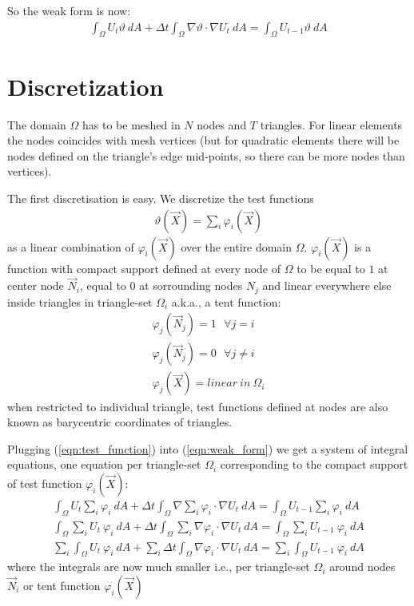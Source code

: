 \documentclass{birkjour}
\numberwithin{equation}{section}
\begin{document}
So the weak form is now:
\begin{eqnarray}
	\label{eqn:weak_form}
	\int_{\Omega}{ U_t \vartheta \ dA } + \Delta t \int_{\Omega}{ \nabla \vartheta \cdot \nabla U_t \ dA} = \int_{\Omega} { U_{t-1} \vartheta \ dA }
\end{eqnarray}


\section{Discretization}
\label{sec:discretization} 

The domain $\Omega$ has to be meshed in $N$ nodes and $T$ triangles. For linear elements the nodes coincides with 
mesh vertices (but for quadratic elements there will be nodes defined on the triangle's edge mid-points, 
so there can be more nodes than vertices).

The first discretisation is easy. We discretize the test functions 
\begin{eqnarray}
	\label{eqn:test_function}
	\vartheta(\vec X) = \sum_i { \varphi_i(\vec X) }
\end{eqnarray} 
as a linear combination of $\varphi_i(\vec X)$ over the entire domain $\Omega$. $\varphi_i(\vec X)$ is a function with compact support 
defined at every node of $\Omega$ to be equal to $1$ at center node $\vec N_i$, equal to $0$ at 
sorrounding nodes $N_j$ and linear everywhere else inside triangles in triangle-set $\Omega_i$ a.k.a., a tent function:
\begin{eqnarray}
	\varphi_j(\vec N_j) = 1 \ \ \  \forall j = i \nonumber\\
	\varphi_j(\vec N_j) = 0 \ \ \  \forall j \neq i \nonumber\\
	\varphi_j(\vec X) = linear \ in \ \Omega_i \nonumber
\end{eqnarray}
when restricted to individual triangle, test functions defined at nodes are also known as barycentric coordinates of triangles.

Plugging (\ref{eqn:test_function}) into (\ref{eqn:weak_form}) we get a system of integral equations, 
one equation per triangle-set $\Omega_i$ corresponding to the compact
support of test function $\varphi_i(\vec X)$:
\begin{eqnarray}
	\int_{\Omega}{ U_t \sum_i { \varphi_i } \ dA } + \Delta t \int_{\Omega}{ \nabla \sum_i { \varphi_i } \cdot \nabla U_t \ dA} = \int_{\Omega} { U_{t-1} \sum_i { \varphi_i } \ dA } \nonumber\\
	\int_{\Omega}{ \sum_i { U_t  \ \varphi_i } \ dA } + \Delta t \int_{\Omega}{ \sum_i { \nabla  \varphi_i \cdot \nabla U_t } \ dA} = \int_{\Omega} { \sum_i { U_{t-1}  \ \varphi_i } \ dA } \nonumber\\
	\sum_i { \int_{\Omega}{ U_t  \ \varphi_i  \ dA } } + \sum_i { \Delta t \int_{\Omega}{ \nabla  \varphi_i \cdot \nabla U_t \ dA}} = \sum_i { \int_{\Omega} { U_{t-1}  \ \varphi_i \ dA } } \nonumber
\end{eqnarray}
where the integrals are now much smaller i.e., per triangle-set $\Omega_i$ around nodes $\vec N_i$ or tent function $\varphi_i(\vec X)$
\end{document}
